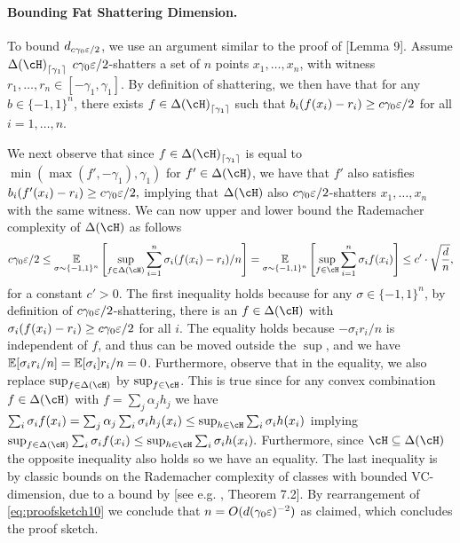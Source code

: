 \paragraph{Bounding Fat Shattering Dimension.}
To bound $d_{c\gamma_0\varepsilon/2}$, we use an argument similar to the proof of \cite{larsen2022optimalweakstronglearning} [Lemma 9]. Assume $ \dlh_{\left\lceil\gamma_1 \right\rceil}$ $ c\gamma_0\varepsilon/2$-shatters a set of $n$ points $ x_1,\ldots,x_{n} $, with witness $ r_{1},\ldots,r_{n}\in [-\gamma_1,\gamma_1] $. By definition of shattering, we then have that for any $  b\in \{ -1, 1\}^{n}$, there exists $ f\in  \dlh_{\left\lceil\gamma_1 \right\rceil}$ such that $ b_{i}(f(x_{i})-r_{i})\geq c\gamma_0\varepsilon/2$ for all $ i=1,\ldots,n$.

We next observe that since $ f\in  \dlh_{\left\lceil\gamma_1 \right\rceil}$ is equal to $ \min(\max(f',-\gamma_1),\gamma_1) $  for $ f'\in \dlh $, we have that $ f' $ also satisfies $ b_{i}(f'(x_{i})-r_{i})\geq c\gamma_0\varepsilon/2,$ implying that $ \dlh$ also $c\gamma_0\varepsilon/2$-shatters $ x_1,\ldots,x_{n} $ with the same witness. We can now upper and lower bound the Rademacher complexity of $ \dlh $ as follows
\begin{align}\label{eq:proofsketch10}
    c\gamma_0\eps/2 \leq \e_{\sigma\sim \{ -1,1 \}^{n} }\left[\sup_{f\in \dlh} \sum_{i=1}^{n}\sigma_{i}(f(x_{i})-r_{i})/n\right] = \e_{\sigma\sim \{ -1,1 \}^{n} }\left[\sup_{f\in \cH} \sum_{i=1}^{n}\sigma_{i}f(x_{i})\right]  \leq c' \cdot \sqrt{\frac{d}{n}},
\end{align}
for a constant $c'>0$. The first inequality holds because for any $\sigma \in \{-1,1\}^n$, by definition of $c\gamma_0\varepsilon/2$-shattering, there is an $f \in \dlh$ with $ \sigma_{i}(f(x_{i})-r_{i})\geq c\gamma_0\varepsilon/2$ for all $i$. The equality holds because $-\sigma_i r_i/n$ is independent of $f$, and thus can be moved outside the $\sup$, and we have $\operatorname*{\mathbb{E}}[\sigma_i r_i/n] = \operatorname*{\mathbb{E}}[\sigma_i]r_i/n=0$. Furthermore, observe that in the equality, we also replace $\sup_{f \in \dlh}$ by $\sup_{f \in \cH}$. This is true since for any convex combination $f \in \dlh$ with $f = \sum_j \alpha_j h_j$ we have $ \sum_{i}\sigma_{i}f(x_{i})=\sum_{j}\alpha_{j}\sum_{i}\sigma_{i}h_{j}(x_{i})\leq \sup_{h\in\cH}\sum_{i}\sigma_{i}h(x_{i}) $ implying $ \sup_{f\in\dlh} \sum_{i}\sigma_{i}f(x_{i})\leq \sup_{h\in\cH}\sum_{i}\sigma_{i}h(x_{i}).$ Furthermore, since $ \cH\subseteq\dlh $ the opposite inequality also holds so we have an equality. The last inequality is by classic bounds on the Rademacher complexity of classes with bounded VC-dimension, due to a bound by \cite{dudley} [see e.g. \cite{rademacherboundlecturenotes}, Theorem 7.2]. By rearrangement of \cref{eq:proofsketch10} we conclude that $ n= O(d (\gamma_0\varepsilon)^{-2}) $ as claimed, which concludes the proof sketch.

